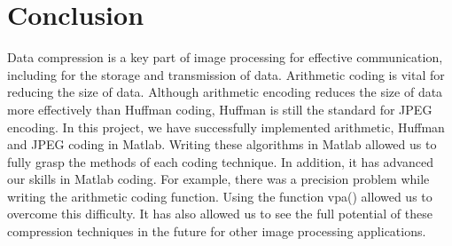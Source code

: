 \documentclass[11pt,a4paper,table]{article}
\begin{document}
\section{Conclusion}
Data compression is a key part of image processing for effective communication, including for the storage and transmission of data. Arithmetic coding is vital for reducing the size of data. Although arithmetic encoding reduces the size of data more effectively than Huffman coding, Huffman is still the standard for JPEG encoding. In this project, we have successfully implemented arithmetic, Huffman and JPEG coding in Matlab. Writing these algorithms in Matlab allowed us to fully grasp the methods of each coding technique. In addition, it has advanced our skills in Matlab coding. For example, there was a precision problem while writing the arithmetic coding function. Using the function vpa() allowed us to overcome this difficulty. It has also allowed us to see the full potential of these compression techniques in the future for other image processing applications.
\pagebreak



\pagebreak
\end{document}
